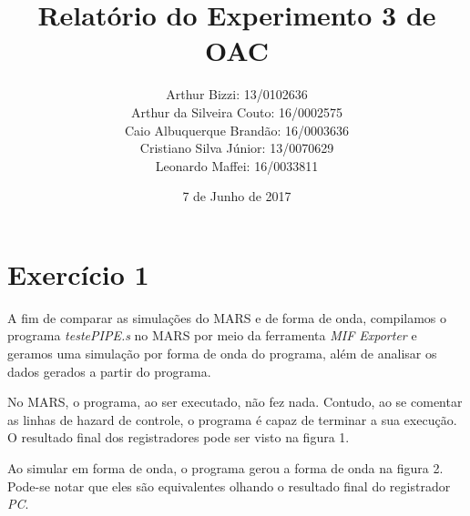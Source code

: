 \documentclass[12pt, a4paper, twoside]{article}
\begin{document}
\title{Relatório do Experimento 3 de OAC}
\author{
Arthur Bizzi: 13/0102636 \\
Arthur da Silveira Couto: 16/0002575 \\
Caio Albuquerque Brandão: 16/0003636 \\
Cristiano Silva Júnior: 13/0070629 \\
Leonardo Maffei: 16/0033811 \\}
\date{7 de Junho de 2017}
\maketitle

\section{Exercício 1}

A fim de comparar as simulações do MARS e de forma de onda, compilamos o programa \textit{testePIPE.s} no MARS por meio da ferramenta \textit{MIF Exporter} e geramos uma simulação por forma de onda do programa, além de analisar os dados gerados a partir do programa.

No MARS, o programa, ao ser executado, não fez nada. Contudo, ao se comentar as linhas de hazard de controle, o programa é capaz de terminar a sua execução. O resultado final dos registradores pode ser visto na figura 1.

Ao simular em forma de onda, o programa gerou a forma de onda na figura 2. Pode-se notar que eles são equivalentes olhando o resultado final do registrador \textit{PC}.
\end{document}

